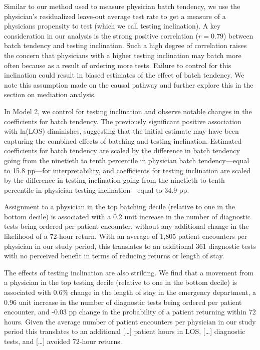 \documentclass[,,nonblindrev]{informs}
\begin{document}
Similar to our method used to measure physician batch tendency, we use
the physician's residualized leave-out average test rate to get a
measure of a physicians propensity to test (which we call testing
inclination). A key consideration in our analysis is the strong positive
correlation (\(r = 0.79\)) between batch tendency and testing
inclination. Such a high degree of correlation raises the concern that
physicians with a higher testing inclination may batch more often
because as a result of ordering more tests. Failure to control for this
inclination could result in biased estimates of the effect of batch
tendency. We note this assumption made on the causal pathway and further
explore this in the section on mediation analysis.

In Model 2, we control for testing inclination and observe notable
changes in the coefficients for batch tendency. The previously
significant positive association with ln(LOS) diminishes, suggesting
that the initial estimate may have been capturing the combined effects
of batching and testing inclination. Estimated coefficients for batch
tendency are scaled by the difference in batch tendency going from the
ninetieth to tenth percentile in physician batch tendency---equal to
15.8 pp---for interpretability, and coefficients for testing inclination
are scaled by the difference in testing inclination going from the
ninetieth to tenth percentile in physician testing inclination---equal
to 34.9 pp.

Assignment to a physician in the top batching decile (relative to one in
the bottom decile) is associated with a 0.2 unit increase in the number
of diagnostic tests being ordered per patient encounter, without any
additional change in the likelihood of a 72-hour return. With an average
of 1,805 patient encounters per physician in our study period, this
translates to an additional 361 diagnostic tests with no perceived
benefit in terms of reducing returns or length of stay.

The effects of testing inclination are also striking. We find that a
movement from a physician in the top testing decile (relative to one in
the bottom decile) is associated with 0.6\% change in the length of stay
in the emergency department, a 0.96 unit increase in the number of
diagnostic tests being ordered per patient encounter, and -0.03 pp
change in the probability of a patient returning within 72 hours. Given
the average number of patient encounters per physician in our study
period this translates to an additional {[}\ldots{]} patient hours in
LOS, {[}\ldots{]} diagnostic tests, and {[}\ldots{]} avoided 72-hour
returns.
\end{document}
